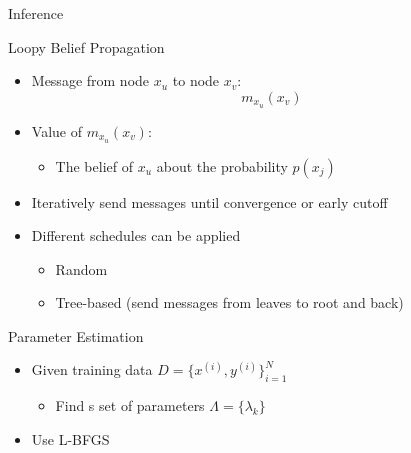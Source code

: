 \documentclass[presentation,bigger]{beamer}
\begin{document}
\begin{frame}[label={sec:orgheadline19}]{Inference}
\begin{block}{Loopy Belief Propagation}
\begin{itemize}
\item Message from node \(x_u\) to node \(x_v\):
\[ m_{x_u}(x_v) \]
\item Value of \(m_{x_u}(x_v)\):
\begin{itemize}
\item The belief of \(x_u\) about the probability \(p(x_j)\)
\end{itemize}
\item Iteratively send messages until convergence or early cutoff
\item Different schedules can be applied
\begin{itemize}
\item Random
\item Tree-based (send messages from leaves to root and back)
\end{itemize}
\end{itemize}
\end{block}
\end{frame}
\begin{frame}[label={sec:orgheadline20}]{Parameter Estimation}
\begin{itemize}
\item Given training data \(D = \{x^{(i)},y^{(i)}\}^N_{i=1}\)
\begin{itemize}
\item Find s set of parameters \(\Lambda = \{\lambda_k\}\)
\end{itemize}
\item Use L-BFGS
\end{itemize}
\end{frame}
\end{document}
